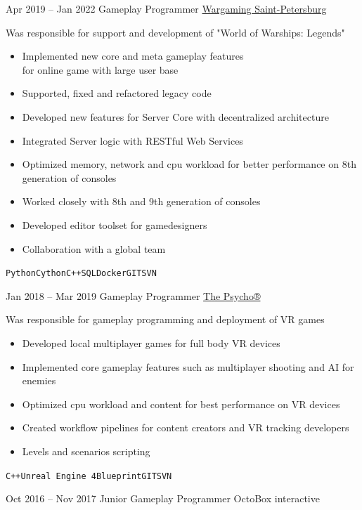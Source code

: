 \documentclass[9pt]{developercv} %
\begin{document}


\begin{entrylist}
	\entry
	{Apr 2019 -- Jan 2022}
	{Gameplay Programmer}
	{\href{https://na.wargaming.net/en/games/wowsconsole}{Wargaming Saint-Petersburg}}
	{

		Was responsible for support and development of "World of Warships: Legends"
		\begin{itemize}
			\item Implemented new core and meta gameplay features \\for online game with large user base
			\item Supported, fixed and refactored legacy code
			\item Developed new features for Server Core with decentralized architecture
			\item Integrated Server logic with RESTful Web Services
			\item Optimized memory, network and cpu workload for better performance on 8th generation of consoles
			\item Worked closely with 8th and 9th generation of consoles
			\item Developed editor toolset for gamedesigners
			\item Collaboration with a global team
		\end{itemize}
		\texttt{Python}\slashsep\texttt{Cython}\slashsep\texttt{C++}\slashsep\texttt{SQL}\slashsep\texttt{Docker}\slashsep\texttt{GIT}\slashsep\texttt{SVN}}
	\entry
	{Jan 2018 -- Mar 2019}
	{Gameplay Programmer}
	{\href{https://www.thepsycho.net/}{The Psycho®}}
	{

	Was responsible for gameplay programming and deployment of VR games
	\begin{itemize}
		\item Developed local multiplayer games for full body VR devices
		\item Implemented core gameplay features such as multiplayer shooting and AI for enemies
		\item Optimized cpu workload and content for best performance on VR devices
		\item Created workflow pipelines for content creators and VR tracking developers
		\item Levels and scenarios scripting
	\end{itemize}
	{\texttt{C++}\slashsep\texttt{Unreal Engine 4}\slashsep\texttt{Blueprint}\slashsep\texttt{GIT}\slashsep\texttt{SVN}}
	}
	\entry
	{Oct 2016 -- Nov 2017}
	{Junior Gameplay Programmer}
	{OctoBox interactive}
	{

}
\end{entrylist}
\end{document}
